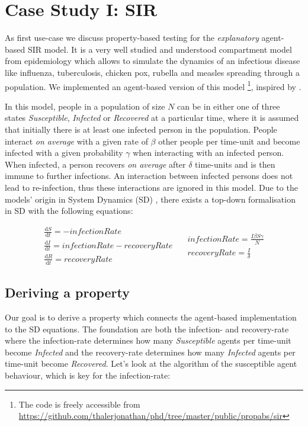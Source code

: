 \section{Case Study I: SIR}
\label{sec:case_SIR}
As first use-case we discuss property-based testing for the \textit{explanatory} agent-based SIR model. It is a very well studied and understood compartment model from epidemiology \cite{kermack_contribution_1927} which allows to simulate the dynamics of an infectious disease like influenza, tuberculosis, chicken pox, rubella and measles spreading through a population. We implemented an agent-based version of this model \footnote{The code is freely accessible from \url{https://github.com/thalerjonathan/phd/tree/master/public/propabs/sir}}, inspired by \cite{macal_agent-based_2010}.

In this model, people in a population of size $N$ can be in either one of three states \textit{Susceptible}, \textit{Infected} or \textit{Recovered} at a particular time, where it is assumed that initially there is at least one infected person in the population. People interact \textit{on average} with a given rate of $\beta$ other people per time-unit and become infected with a given probability $\gamma$ when interacting with an infected person. When infected, a person recovers \textit{on average} after $\delta$ time-units and is then immune to further infections. An interaction between infected persons does not lead to re-infection, thus these interactions are ignored in this model. Due to the models' origin in System Dynamics (SD) \cite{porter_industrial_1962}, there exists a top-down formalisation in SD with the following equations:

\begin{equation}
\begin{split}
\frac{\mathrm d S}{\mathrm d t} = -infectionRate \\
\frac{\mathrm d I}{\mathrm d t} = infectionRate - recoveryRate \\
\frac{\mathrm d R}{\mathrm d t} = recoveryRate 
\end{split}
\quad
\begin{split}
infectionRate = \frac{I \beta S \gamma}{N} \\
recoveryRate = \frac{I}{\delta} 
\end{split}
\end{equation}

\subsection{Deriving a property}
Our goal is to derive a property which connects the agent-based implementation to the SD equations. The foundation are both the infection- and recovery-rate where the infection-rate determines how many \textit{Susceptible} agents per time-unit become \textit{Infected} and the recovery-rate determines how many \textit{Infected} agents per time-unit become \textit{Recovered}. Let's look at the algorithm of the susceptible agent behaviour, which is key for the infection-rate:

